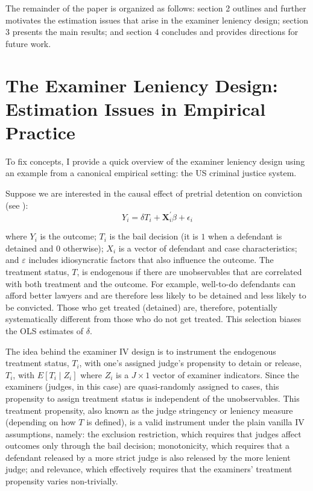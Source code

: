 The remainder of the paper is organized as follows: section 2 outlines and further motivates the estimation issues that arise in the examiner leniency design; section 3 presents the main results; and section 4 concludes and provides directions for future work.

\section{The Examiner Leniency Design: Estimation Issues in Empirical Practice}
To fix concepts, I provide a quick overview of the examiner leniency design using an example from a canonical empirical setting: the US criminal justice system. 

Suppose we are interested in the causal effect of pretrial detention on conviction (see \citet{frandsen2023judging}): 
$$Y_{i} = \delta T_{i}+\mathbf{X}_{i}^{\prime} \beta+\epsilon_{i}$$

where $Y_i$ is the outcome; $T_i$ is the bail decision (it is $1$ when a defendant is detained and $0$ otherwise); $X_i$ is a vector of defendant and case characteristics; and $\varepsilon$ includes idiosyncratic factors that also influence the outcome. The treatment status, $T$, is endogenous if there are unobservables that are correlated with both treatment and the outcome. For example, well-to-do defendants can afford better lawyers and are therefore less likely to be detained and less likely to be convicted. Those who get treated (detained) are, therefore, potentially systematically different from those who do not get treated.  This selection biases the OLS estimates of $\delta$.

The idea behind the examiner IV design is to instrument the endogenous treatment status, $T_i$, with one's assigned judge's propensity to detain or release, $T_i$, with $E\left[T_i \mid Z_i\right]$ where $Z_i$ is a $J \times 1$ vector of examiner indicators. Since the examiners (judges, in this case) are quasi-randomly assigned to cases, this propensity to assign treatment status is independent of the unobservables. This treatment propensity, also known as the judge stringency or leniency measure (depending on how $T$ is defined), is a valid instrument under the plain vanilla IV assumptions, namely: the exclusion restriction, which requires that judges affect outcomes only through the bail decision; monotonicity, which requires that a defendant released by a more strict judge is also released by the more lenient judge; and relevance, which effectively requires that the examiners' treatment propensity varies non-trivially. 

